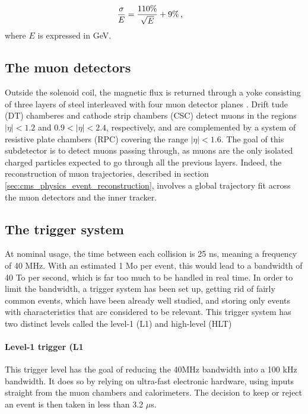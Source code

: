 \begin{equation}
    \frac{\sigma}{E} = \frac{110 \%}{\sqrt{E}} + 9\% \msep
\end{equation}
where $E$ is expressed in GeV.
\subsection{The muon detectors}

Outside the solenoid coil, the magnetic flux is returned through a yoke consisting of three layers of steel interleaved with four muon detector planes \cite{CERN-LHCC-97-032,collaboration_2013}. Drift tude (DT) chamberes and cathode strip chambers (CSC) detect muons in the regions $|\eta| < 1.2$ and $0.9 < |\eta| < 2.4$, respectively, and are complemented by a system of resistive plate chambers (RPC) covering the range $|\eta| < 1.6$. The goal of this subdetector is to detect muons passing through, as muons are the only isolated charged particles expected to go through all the previous layers. Indeed, the reconstruction of muon trajectories, described in section \ref{sec:cms_physics_event_reconstruction}, involves a global trajectory fit across the muon detectors and the inner tracker.

\subsection{The trigger system}
\label{sec:trigger}

At nominal usage, the time between each collision is 25 ns, meaning a frequency of 40 MHz. With an estimated 1 Mo per event, this would lead to a bandwidth of 40 To per second, which is far too much to be handled in real time. In order to limit the bandwidth, a trigger system has been set up, getting rid of fairly common events, which have been already well studied, and storing only events with characteristics that are considered to be relevant. This trigger system has two distinct levels called the level-1 (L1) and high-level (HLT)

\paragraph{Level-1 trigger (L1} This trigger level has the goal of reducing the 40MHz bandwidth into a 100 kHz bandwidth. It does so by relying on ultra-fast electronic hardware, using inputs straight from the muon chambers and calorimeters. The decision to keep or reject an event is then taken in less than 3.2 $\mu$s. 

